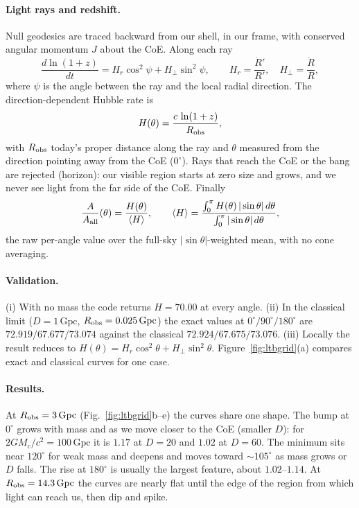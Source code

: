 \documentclass[11pt,a4paper]{article}
\begin{document}
\paragraph{Light rays and redshift.} Null geodesics are traced backward from our shell, in our frame, with conserved angular momentum \(J\) about the CoE. Along each ray
\begin{equation}
\frac{d\ln(1+z)}{dt}=H_r\cos^{2}\psi+H_\perp\sin^{2}\psi,\qquad H_r=\frac{\dot R'}{R'},\quad H_\perp=\frac{\dot R}{R},
\end{equation}
where \(\psi\) is the angle between the ray and the local radial direction. The direction-dependent Hubble rate is
\begin{equation}
H(\theta)=\frac{c\,\ln(1+z)}{R_{\rm obs}},
\end{equation}
with \(R_{\rm obs}\) today's proper distance along the ray and \(\theta\) measured from the direction pointing away from the CoE (\(0^\circ\)). Rays that reach the CoE or the bang are rejected (horizon): our visible region starts at zero size and grows, and we never see light from the far side of the CoE. Finally
\begin{equation}
\frac{A}{A_{\rm all}}(\theta)=\frac{H(\theta)}{\langle H\rangle},\qquad \langle H\rangle=\frac{\int_0^{\pi}H(\theta)\,|\sin\theta|\,d\theta}{\int_0^{\pi}|\sin\theta|\,d\theta},
\end{equation}
the raw per-angle value over the full-sky \(|\sin\theta|\)-weighted mean, with no cone averaging.

\paragraph{Validation.} (i) With no mass the code returns \(H=70.00\) at every angle. (ii) In the classical limit (\(D=1\,\mathrm{Gpc}\), \(R_{\rm obs}=0.025\,\mathrm{Gpc}\)) the exact values at \(0^\circ/90^\circ/180^\circ\) are \(72.919/67.677/73.074\) against the classical \(72.924/67.675/73.076\). (iii) Locally the result reduces to \(H(\theta)=H_r\cos^{2}\theta+H_\perp\sin^{2}\theta\). Figure~\ref{fig:ltbgrid}(a) compares exact and classical curves for one case.

\paragraph{Results.} At \(R_{\rm obs}=3\,\mathrm{Gpc}\) (Fig.~\ref{fig:ltbgrid}b--e) the curves share one shape. The bump at \(0^\circ\) grows with mass and as we move closer to the CoE (smaller \(D\)): for \(2GM_c/c^{2}=100\,\mathrm{Gpc}\) it is \(1.17\) at \(D=20\) and \(1.02\) at \(D=60\). The minimum sits near \(120^\circ\) for weak mass and deepens and moves toward \(\sim105^\circ\) as mass grows or \(D\) falls. The rise at \(180^\circ\) is usually the largest feature, about \(1.02\)--\(1.14\). At \(R_{\rm obs}=14.3\,\mathrm{Gpc}\) the curves are nearly flat until the edge of the region from which light can reach us, then dip and spike.
\end{document}
